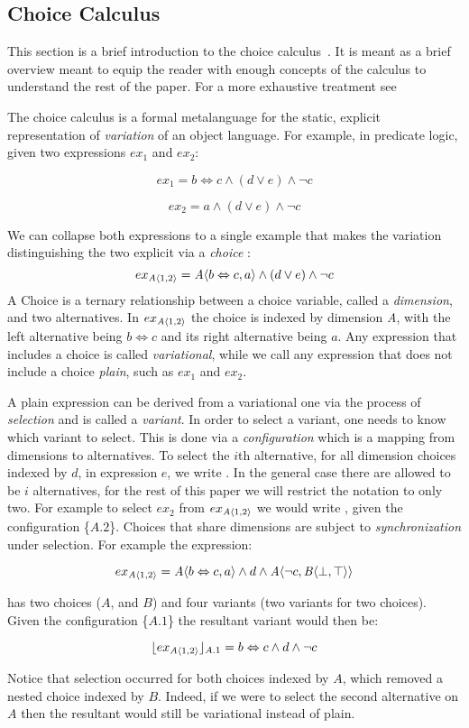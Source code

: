 \subsection{Choice Calculus}
\label{bk-cc}
This section is a brief introduction to the choice calculus~\cite{Walk13thesis,
  Erwig:2011:CCR:2063239.2063245}. It is meant as a brief overview meant to
equip the reader with enough concepts of the calculus to understand the
rest of the paper. For a more exhaustive treatment see


The choice calculus is a
formal metalanguage for the static, explicit representation of
\textit{variation} of an object language. For example, in predicate logic, given
two expressions $ex_1$ and $ex_2$:

\[ex_1 = b \Leftrightarrow c \wedge (d \vee e) \wedge \neg c \]

\[ex_2 = a \wedge (d \vee e) \wedge \neg c \]

We can collapse both expressions to a single example that makes the variation
distinguishing the two explicit via a \textit{choice} :
\[ex_{\chc[A]{1,2}} = \chc[A]{b \Leftrightarrow c, a} \wedge (d \vee e) \wedge
  \neg c \]
A Choice is a ternary relationship between a choice variable, called a
\textit{dimension}, and two alternatives. In $ex_{\chc[A]{1,2}}$ the choice is
indexed by dimension \textit{A}, with the left alternative being $ b
\Leftrightarrow c$ and its right alternative being $a$. Any expression that
includes a choice is called \textit{variational}, while we call any expression
that does not include a choice \textit{plain}, such as $ex_1$ and $ex_2$.

A plain expression can be derived from a variational one via the process of
\textit{selection} and is called a \textit{variant}. In order to select a
variant, one needs to know which variant to select. This is done via a
\textit{configuration} which is a mapping from dimensions to
alternatives. To select the $i$th alternative, for all dimension choices indexed
by $d$, in expression $e$, we write . In the general case there are
allowed to be $i$ alternatives, for the rest of this paper we will restrict the
notation to only two. For example to select $ex_2$ from $ex_{\chc[A]{1,2}}$ we
would write , given the configuration \{$A.2$\}.
%
%
Choices that share dimensions are subject to \textit{synchronization} under
selection. For example the expression:

\[ex_{\chc[A]{1,2}} = \chc[A]{b \Leftrightarrow c, a} \wedge d \wedge \chc[A]{\neg c,
    \chc[B]{\bot, \top}} \]

has two choices ($A$, and $B$) and four variants (two variants for two choices).
Given the configuration \{$A.1$\} the resultant variant would then be:

\[ \tsel[A.1]{ex_{\chc[A]{1,2}}}= b \Leftrightarrow c \wedge d \wedge \neg c \]

Notice that selection occurred for both choices indexed by $A$, which removed a
nested choice indexed by $B$. Indeed, if we were to select the second
alternative on $A$ then the resultant would still be variational instead of
plain.
